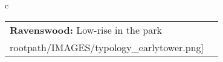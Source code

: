 \begin{table}[H]
        \begin{tabular}{c}
        \begin{tabular}{m{1.5in} m{2in}}
\textbf{Ravenswood:} {Low-rise in the park} & \texttt{[image: \\rootpath/IMAGES/typology\_earlytower.png]}
\end{tabular}\end{tabular}
        \end{table}